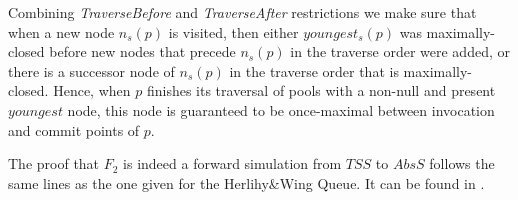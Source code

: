 Combining \emph{TraverseBefore} and \emph{TraverseAfter} restrictions we make sure that when a new node $n_s(p)$ is visited, then either $youngest_s(p)$ was maximally-closed before new nodes that precede $n_s(p)$ in the traverse order were added, or there is a successor node of $n_s(p)$ in the traverse order that is maximally-closed. Hence, when $p$ finishes its traversal of pools with a non-null and present $youngest$ node, this node is guaranteed to be once-maximal between invocation and commit points of $p$.

The proof that $F_2$ is indeed a forward simulation from $\mathit{TSS}$ to $AbsS$ follows the same lines as the one given for the Herlihy\&Wing Queue. It can be found in \cite{extended}.

